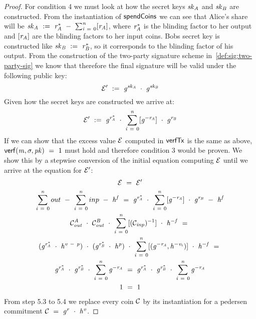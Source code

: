 \begin{proof}
    For condition 4 we must look at how the secret keys $\mathit{sk}_{\mathit{A}}$ and $\mathit{sk}_{\mathit{B}}$ are constructed.
    From the instantiation of $\mathsf{spendCoins}$ we can see that Alice's share will be $\mathit{sk}_{\mathit{A}} ~:=~ \mathit{r}_{\mathit{A}}^* ~-~ \sum_{\mathit{i} ~=~ 0}^{\mathit{n}} [\mathit{r}_{\mathit{A}}]$, where $\mathit{r}_{\mathit{A}}^*$ is the blinding factor to her output and $[\mathit{r}_{\mathit{A}}]$ are the blinding factors to her input coins.
    Bobs secret key is constructed like $\mathit{sk}_{\mathit{B}} ~:=~ \mathit{r}_{\mathit{B}}^*$, so it corresponds to the blinding factor of his output.
    From the construction of the two-party signature scheme in~\ref{def:sig:two-party-sig} we know that therefore the final signature will be valid under the following public key:
    \[ {\mathcal{E}}' ~:=~ \mathit{g}^{\mathit{sk}_{\mathit{A}}} ~\cdot~ \mathit{g}^{\mathit{sk}_{\mathit{B}}} \]
    Given how the secret keys are constructed we arrive at:
    \[ {\mathcal{E}}' ~:=~ \mathit{g}^{\mathit{r}_{\mathit{A}}^*} ~\cdot~ \sum_{\mathit{i} ~=~ 0}^{\mathit{n}} [\mathit{g}^{- \mathit{r}_{\mathit{A}}}] ~\cdot~ \mathit{g}^{\mathit{r}_{\mathit{B}}} \]
    If we can show that the excess value $\mathcal{E}$ computed in $\mathsf{verfTx}$ is the same as above, $\mathsf{verf}(\mathit{m}, \sigma, \mathit{pk}) ~=~ 1$ must hold and therefore condition 3 would be proven.
    We show this by a stepwise conversion of the initial equation computing $\mathcal{E}$ until we arrive at the equation for ${\mathcal{E}}'$:
    \begin{gather}
        \mathcal{E} ~=~ {\mathcal{E}}' \\
        \sum_{\mathit{i} ~=~ 0}^{\mathit{n}} out ~-~ \sum_{\mathit{i} ~=~ 0}^{\mathit{n}} inp ~-~ \mathit{h}^{\mathit{f}}  ~=~ \mathit{g}^{\mathit{r}_{\mathit{A}}^*} ~\cdot~ \sum_{\mathit{i} ~=~ 0}^{\mathit{n}} [\mathit{g}^{- \mathit{r}_{\mathit{A}}}] ~\cdot~ \mathit{g}^{\mathit{r}_{\mathit{B}}} ~-~ \mathit{h}^{\mathit{f}} \\
        \mathcal{C}_{\mathit{out}}^{\mathit{A}} ~\cdot~ \mathcal{C}_{\mathit{out}}^{\mathit{B}} ~\cdot~ \sum_{\mathit{i} ~=~ 0}^{\mathit{n}} [(\mathcal{C}_{\mathit{inp}})^{-1}] ~\cdot~ \mathit{h}^{- \mathit{f}}  ~=~\\
        (\mathit{g}^{\mathit{r}_{\mathit{A}}^*} ~\cdot~ \mathit{h}^{\mathit{v} ~-~ \mathit{p}}) ~\cdot~
        (\mathit{g}^{\mathit{r}_{\mathit{B}}^*} ~\cdot~ \mathit{h}^{\mathit{p}}) ~\cdot~
        \sum_{\mathit{i} ~=~ 0}^{\mathit{n}} [(\mathit{g}^{- \mathit{r}_{\mathit{A}}}, \mathit{h}^{- \mathit{v}_i})] ~\cdot~ \mathit{h}^{- \mathit{f}} ~=~ \\
        \mathit{g}^{\mathit{r}_{\mathit{A}}^*} ~\cdot~ \mathit{g}^{\mathit{r}_{\mathit{B}}^*} ~\cdot~ \sum_{\mathit{i} ~=~ 0}^{\mathit{n}} \mathit{g}^{- \mathit{r}_{\mathit{A}}} ~=~ \mathit{g}^{\mathit{r}_{\mathit{A}}^*} ~\cdot~ \mathit{g}^{\mathit{r}_{\mathit{B}}^*} ~\cdot~ \sum_{\mathit{i} ~=~ 0}^{\mathit{n}} \mathit{g}^{- \mathit{r}_{\mathit{A}}} \\
        1 ~=~ 1
    \end{gather}
    From step 5.3 to 5.4 we replace every coin $\mathcal{C}$ by its instantiation for a pedersen commitment $\mathcal{C} ~=~ \mathit{g}^{\mathit{r}} ~\cdot~ \mathit{h}^{\mathit{v}}$.


\end{proof}
